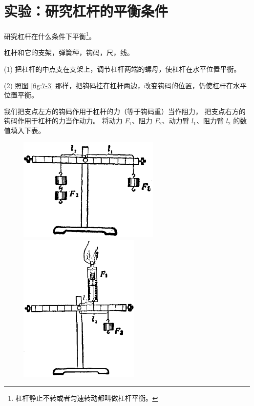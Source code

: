 \section{实验：研究杠杆的平衡条件}\label{sec:7-2}

 研究杠杆在什么条件下平衡\footnote{杠杆静止不转或者匀速转动都叫做杠杆平衡。}。

 杠杆和它的支架，弹簧秤，钩码，尺，线。


(1) 把杠杆的中点支在支架上，调节杠杆两端的螺母，使杠杆在水平位置平衡。

(2) 照图 \ref{fig:7-3} 那样，把钩码挂在杠杆两边，改变钩码的位置，仍使杠杆在水平位置平衡。

我们把支点左方的钩码作用于杠杆的力（等于钩码重）当作阻力，
把支点右方的钩码作用于杠杆的力当作动力。
将动力 $F_1$、阻力 $F_2$、动力臂 $l_1$、阻力臂 $l_2$ 的数值填入下表。

\begin{figure}[htbp]
    \centering
    \begin{minipage}{7cm}
    \centering
    \includegraphics[width=7cm]{../pic/czwl1-ch7-3}
    \caption{}\label{fig:7-3}
    \end{minipage}
    \qquad
    \begin{minipage}{7cm}
    \centering
    \includegraphics[width=6cm]{../pic/czwl1-ch7-4}
    \caption{}\label{fig:7-4}
    \end{minipage}
\end{figure}

